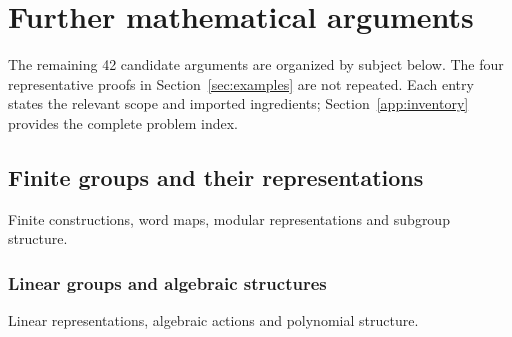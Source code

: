 \section{Further mathematical arguments}
\label{app:candidates}
The remaining 42 candidate arguments are organized by subject below.
The four representative proofs in Section~\ref{sec:examples} are not
repeated. Each entry states the relevant scope and imported ingredients;
Section~\ref{app:inventory} provides the complete problem index.

\subsection{Finite groups and their representations}
\label{portfolio:finite}
Finite constructions, word maps, modular representations and subgroup structure.
\begingroup
\let\subsection\subsubsection









\endgroup

\subsection{Linear groups and algebraic structures}
\label{portfolio:linear}
Linear representations, algebraic actions and polynomial structure.
\begingroup
\let\subsection\subsubsection













\endgroup

